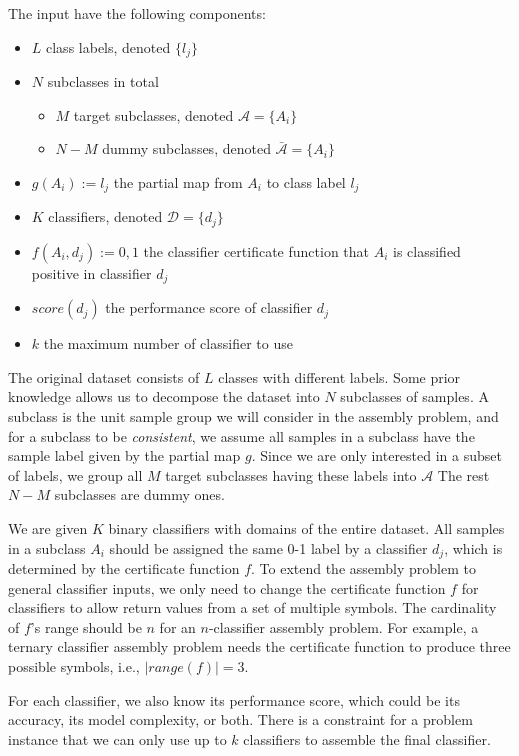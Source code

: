 \documentclass[sigplan,10pt,review]{acmart}\settopmatter{printfolios=true,printccs=false,printacmref=false}
\begin{document}
The input have the following components:
\begin{itemize}
	\item $L$ class labels, denoted $\{l_j\}$
	\item $N$ subclasses in total \begin{itemize}
		\item $M$ target subclasses, denoted $\mathcal{A} = \{A_i\}$
		\item $N-M$ dummy subclasses, denoted $\bar{\mathcal{A}} = \{A_i\}$
	\end{itemize}
	\item $g(A_i) := l_j$ the partial map from $A_i$ to class label $l_j$
	\item $K$ classifiers, denoted $\mathcal{D} = \{d_j\}$
	\item $f(A_i, d_j) := 0, 1$ the classifier certificate function that $A_i$ is classified positive in classifier $d_j$
	\item $score(d_j)$ the performance score of classifier $d_j$
	\item $k$ the maximum number of classifier to use
\end{itemize}

The original dataset consists of $L$ classes with different labels.
Some prior knowledge allows us to decompose the dataset into $N$ subclasses of samples.
A subclass is the unit sample group we will consider in the assembly problem, and for a subclass to be \textit{consistent}, we assume all samples in a subclass have the sample label given by the partial map $g$.
Since we are only interested in a subset of labels, we group all $M$ target subclasses having these labels into $\mathcal{A}$
The rest $N-M$ subclasses are dummy ones.

We are given $K$ binary classifiers with domains of the entire dataset.
All samples in a subclass $A_i$ should be assigned the same 0-1 label by a classifier $d_j$, which is determined by the certificate function $f$.
To extend the assembly problem to general classifier inputs, we only need to change the certificate function $f$ for classifiers to allow return values from a set of multiple symbols.
The cardinality of $f$'s range should be $n$ for an $n$-classifier assembly problem.
For example, a ternary classifier assembly problem needs the certificate function to produce three possible symbols, i.e., $|range(f)| = 3$.

For each classifier, we also know its performance score, which could be its accuracy, its model complexity, or both.
There is a constraint for a problem instance that we can only use up to $k$ classifiers to assemble the final classifier.
\end{document}
